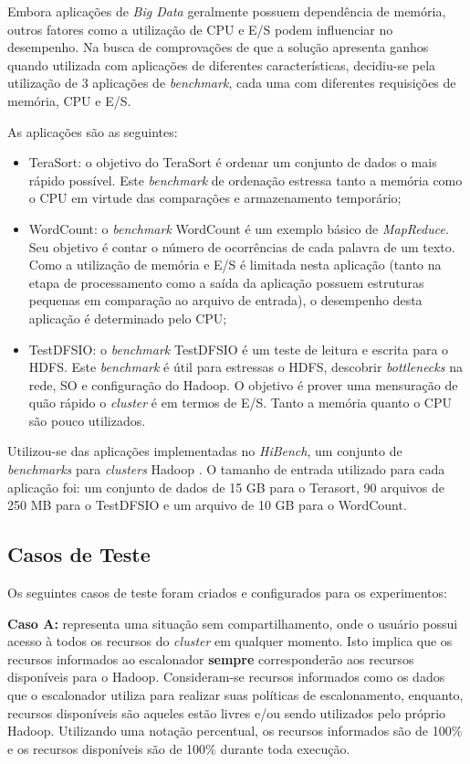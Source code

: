 Embora aplicações de \textit{Big Data} geralmente possuem dependência de memória, outros fatores como a utilização de CPU e E/S podem influenciar no desempenho. Na busca de comprovações de que a solução apresenta ganhos quando utilizada com aplicações de diferentes características, decidiu-se pela utilização de 3 aplicações de \textit{benchmark}, cada uma com diferentes requisições de memória, CPU e E/S.

As aplicações são as seguintes:
\begin{itemize}
	\item TeraSort: o objetivo do TeraSort \citep{TeraSort2008} é ordenar um conjunto de dados o mais rápido possível. Este \textit{benchmark} de ordenação estressa tanto a memória como o CPU em virtude das comparações e armazenamento temporário;
	\item WordCount: o \textit{benchmark} WordCount é um exemplo básico de \textit{MapReduce}. Seu objetivo é contar o número de ocorrências de cada palavra de um texto. Como a utilização de memória e E/S é limitada nesta aplicação (tanto na etapa de processamento como a saída da aplicação possuem estruturas pequenas em comparação ao arquivo de entrada), o desempenho desta aplicação é determinado pelo CPU;
	\item TestDFSIO: o \textit{benchmark} TestDFSIO é um teste de leitura e escrita para o HDFS. Este \textit{benchmark} é útil para estressas o HDFS, descobrir \textit{bottlenecks} na rede, SO e configuração do Hadoop. O objetivo é prover uma mensuração de quão rápido o \textit{cluster} é em termos de E/S. Tanto a memória quanto o CPU são pouco utilizados.
\end{itemize}

Utilizou-se das aplicações implementadas no \textit{HiBench}, um conjunto de \textit{benchmarks} para \textit{clusters} Hadoop \cite{HiBench}. O tamanho de entrada utilizado para cada aplicação foi: um conjunto de dados de 15 GB para o Terasort, 90 arquivos de 250 MB para o TestDFSIO e um arquivo de 10 GB para o WordCount. 

\subsection{Casos de Teste}
Os seguintes casos de teste foram criados e configurados para os experimentos:

\textbf{Caso A:} representa uma situação sem compartilhamento, onde o usuário possui acesso à todos os recursos do \textit{cluster} em qualquer momento. Isto implica que os recursos informados ao escalonador \textbf{sempre} corresponderão aos recursos disponíveis para o Hadoop. Consideram-se recursos informados como os dados que o escalonador utiliza para realizar suas políticas de escalonamento, enquanto, recursos disponíveis são aqueles estão livres e/ou sendo utilizados pelo próprio Hadoop. Utilizando uma notação percentual, os recursos informados são de 100\% e os recursos disponíveis são de 100\% durante toda execução.


